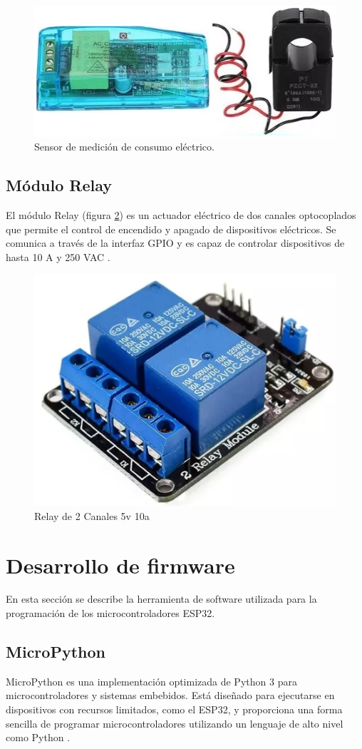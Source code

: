 \begin{figure}[H]
	\centering
	\includegraphics[width=.20\textwidth]{./Images/12.png}
	\caption{Sensor de medición de consumo eléctrico.}
	\label{fig:PZEM-004T}
\end{figure}

\subsection{Módulo Relay}

El módulo Relay (figura \ref{fig:Relay}) es un actuador eléctrico de dos
canales optocoplados que permite el control de encendido y apagado de
dispositivos eléctricos. Se comunica a través de la interfaz GPIO y es capaz de
controlar dispositivos de hasta 10 A y 250 VAC \cite{Relay}.

\begin{figure}[H]
	\centering
	\includegraphics[width=.20\textwidth]{./Images/13.png}
	\caption{Relay de 2 Canales 5v 10a}
	\label{fig:Relay}
\end{figure}


\section{Desarrollo de firmware}

En esta sección se describe la herramienta de software utilizada para la
programación de los microcontroladores ESP32.

\subsection{MicroPython}

MicroPython es una implementación optimizada de Python 3 para
microcontroladores y sistemas embebidos. Está diseñado para ejecutarse en
dispositivos con recursos limitados, como el ESP32, y proporciona una forma
sencilla de programar microcontroladores utilizando un lenguaje de alto nivel
como Python \cite{MicroPython}.

